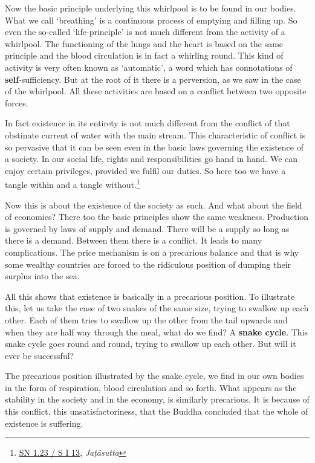 Now the basic principle underlying this whirlpool is to be found in our bodies. What we call `breathing' is a continuous process of emptying and filling up. So even the so-called `life-principle' is not much different from the activity of a whirlpool. The functioning of the lungs and the heart is based on the same principle and the blood circulation is in fact a whirling round. This kind of activity is very often known as `automatic', a word which has connotations of \textbf{self}-sufficiency. But at the root of it there is a perversion, as we saw in the case of the whirlpool. All these activities are based on a conflict between two opposite forces.

In fact existence in its entirety is not much different from the conflict of that obstinate current of water with the main stream. This characteristic of conflict is so pervasive that it can be seen even in the basic laws governing the existence of a society. In our social life, rights and responsibilities go hand in hand. We can enjoy certain privileges, provided we fulfil our duties. So here too we have a tangle within and a tangle without.\footnote{\href{https://suttacentral.net/sn1.23/pli/ms}{SN 1.23 / S I 13}, \emph{Jaṭāsutta}}

Now this is about the existence of the society as such. And what about the field of economics? There too the basic principles show the same weakness. Production is governed by laws of supply and demand. There will be a supply so long as there is a demand. Between them there is a conflict. It leads to many complications. The price mechanism is on a precarious balance and that is why some wealthy countries are forced to the ridiculous position of dumping their surplus into the sea.

All this shows that existence is basically in a precarious position. To illustrate this, let us take the case of two snakes of the same size, trying to swallow up each other. Each of them tries to swallow up the other from the tail upwards and when they are half way through the meal, what do we find? A \textbf{snake cycle}. This snake cycle goes round and round, trying to swallow up each other. But will it ever be successful?

The precarious position illustrated by the snake cycle, we find in our own bodies in the form of respiration, blood circulation and so forth. What appears as the stability in the society and in the economy, is similarly precarious. It is because of this conflict, this unsatisfactoriness, that the Buddha concluded that the whole of existence is suffering.

